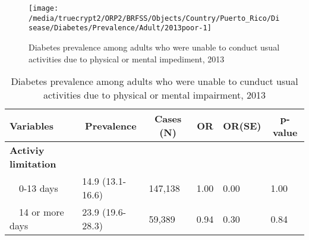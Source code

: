 \begin{figure}[H]
\caption{Diabetes prevalence among adults who were unable to conduct usual activities due to physical or mental impediment, 2013}
\label{fig:poor.Diabetes.2013}

\begin{knitrout}
\color{fgcolor}

{\centering \texttt{[image: /media/truecrypt2/ORP2/BRFSS/Objects/Country/Puerto\_Rico/Disease/Diabetes/Prevalence/Adult/2013poor-1]} 

}



\end{knitrout}
\end{figure}

\begin{table}[H]
\caption{Diabetes prevalence among adults who were unable to cunduct usual activities due to physical or mental impairment, 2013\label{tab:poor.Diabetes.2013}} 
\begin{center}
\begin{tabular}{llllll}
\hline\hline
\multicolumn{1}{l}{Variables}&\multicolumn{1}{c}{Prevalence}&\multicolumn{1}{c}{Cases (N)}&\multicolumn{1}{c}{OR}&\multicolumn{1}{c}{OR(SE)}&\multicolumn{1}{c}{p-value}\tabularnewline
\hline
{\bfseries Activiy limitation}&&&&&\tabularnewline
~~0-13 days&14.9 (13.1-16.6)&147,138&1.00&0.00&1.00\tabularnewline
~~14 or more days&23.9 (19.6-28.3)& 59,389&0.94&0.30&0.84\tabularnewline
\hline
\end{tabular}\end{center}

\end{table}


